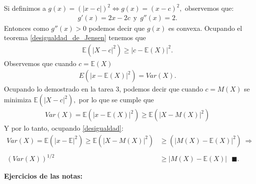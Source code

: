 \documentclass[11pt,letterpaper]{article}
\newcommand{\mE}{\mathbb{E}}
\newcommand{\finf}{\blacksquare.}
\begin{document}
Si definimos a $g(x)=(|x-c|)^2\Leftrightarrow g(x)=(x-c)^2,$  observemos que:
\begin{align*}
g'(x)=2x-2c \ \ \text{y} \ \ g''(x)=2.
\end{align*}
Entonces como $g''(x)>0$ podemos decir que $g(x)$ es convexa. Ocupando el teorema \ref{desigualdad_de_Jensen} tenemos que 
\begin{align} \label{desigualdad}
\mE(|X-c|^2)\geq |c-\mE(X)|^2.
\end{align}
Observemos que cuando $c=\mE(X)$
\begin{align*}
E(|x-\mE(X)|^2)=Var(X).
\end{align*}
Ocupando lo demostrado en la tarea 3, podemos decir que cuando $c=M(X)$ se minimiza $\mE(|X-c|^2),$ por lo que se cumple que
\begin{align*}
Var(X)=\mE(|x-\mE(X)|^2)\geq \mE(|X-M(X)|^2)
\end{align*}
Y por lo tanto, ocupando \ref{desigualdad}:
\begin{align*}
Var(X)=\mE(|x-\mE|^2)\geq \mE(|X-M(X)|^2) &\geq (|M(X)-\mE(X)|^2)\ \Rightarrow \\ \\
(Var(X))^{1/2}&\geq |M(X)-\mE(X)|\ \ \ \finf
\end{align*}

\textbf{Ejercicios de las notas:}
\end{document}
